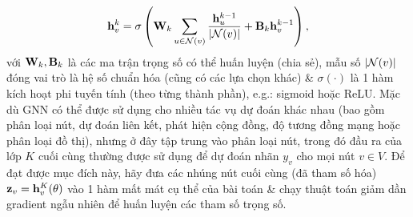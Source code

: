 \documentclass{article}
\begin{document}
\begin{itemize}
    \begin{equation*}
        {\bf h}_v^k = \sigma\left({\bf W}_k\sum_{u\in{\cal N}(v)} \frac{{\bf h}_u^{k-1}}{|{\cal N}(v)|} + {\bf B}_k{\bf h}_v^{k-1}\right),
    \end{equation*}
    với ${\bf W}_k,{\bf B}_k$ là các ma trận trọng số có thể huấn luyện (chia sẻ), mẫu số $|{\cal N}(v)|$ đóng vai trò là hệ số chuẩn hóa (cũng có các lựa chọn khác) \& $\sigma(\cdot)$ là 1 hàm kích hoạt phi tuyến tính (theo từng thành phần), e.g.: sigmoid hoặc ReLU. Mặc dù GNN có thể được sử dụng cho nhiều tác vụ dự đoán khác nhau (bao gồm phân loại nút, dự đoán liên kết, phát hiện cộng đồng, độ tương đồng mạng hoặc phân loại đồ thị), nhưng ở đây tập trung vào phân loại nút, trong đó đầu ra của lớp $K$ cuối cùng thường được sử dụng để dự đoán nhãn $y_v$ cho mọi nút $v\in V$. Để đạt được mục đích này, hãy đưa các nhúng nút cuối cùng (đã tham số hóa) ${\bf z}_v = {\bf h}_v^K(\theta)$ vào 1 hàm mất mát cụ thể của bài toán \& chạy thuật toán giảm dần gradient ngẫu nhiên để huấn luyện các tham số trọng số.

\end{itemize}
\end{document}
